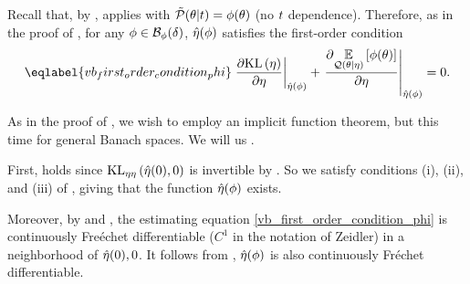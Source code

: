 
%
Recall that, by , 
applies with $\tilde{\mathcal{P}}(\theta \vert t) = \phi(\theta)$ (no $t$ dependence).
Therefore, as in the proof of , for any $\phi \in \mathcal{B}_\phi(\delta)$, $\hat\eta(\phi)$ satisfies the first-order condition
%
\begin{align}\eqlabel{vb_first_order_condition_phi}
%
\fracat{\partial \KL{\eta}}{ \partial \eta}{\etaopt(\phi)} +
\fracat{\partial
    \expect{\q(\theta \vert \eta)}{\phi(\theta)}}
    {\partial \eta}
    {\etaopt(\phi)}
={} 0.
%
\end{align}

As in the proof of , we wish to employ an implicit
function theorem, but this time for general Banach spaces.  We will
us \citet[Theorem 4.B]{zeidler:2013:functional}.

First, \citet[Chapter 4 Condition 21b]{zeidler:2013:functional} holds since
$\mathrm{KL}_{\eta\eta}\left(\hat\eta(0), 0\right)$ is invertible by
.   So we satisfy conditions (i), (ii), and
(iii) of \citet[Theorem 4.B(c)]{zeidler:2013:functional}, giving that the
function $\hat\eta(\phi)$ exists.

Moreover, by  and
, the estimating equation
\eqref{vb_first_order_condition_phi} is continuously Fre{\'e}chet differentiable
($C^1$ in the notation of Zeidler) in a neighborhood of $\hat\eta(0), 0$.
It follows from \citet[Theorem 4.B(d)]{zeidler:2013:functional}, $\hat\eta(\phi)$
is also continuously Fr{\'e}chet differentiable.

%





